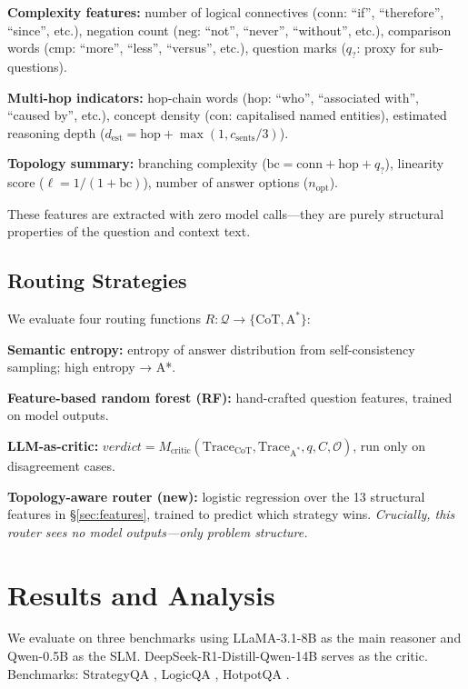 \documentclass[11pt]{article}
\begin{document}
\textbf{Complexity features:} number of logical connectives ($\mathrm{conn}$: ``if'', ``therefore'', ``since'', etc.), negation count ($\mathrm{neg}$: ``not'', ``never'', ``without'', etc.), comparison words ($\mathrm{cmp}$: ``more'', ``less'', ``versus'', etc.), question marks ($q_?$: proxy for sub-questions).

\textbf{Multi-hop indicators:} hop-chain words ($\mathrm{hop}$: ``who'', ``associated with'', ``caused by'', etc.), concept density ($\mathrm{con}$: capitalised named entities), estimated reasoning depth ($d_{\mathrm{est}} = \mathrm{hop} + \max(1, c_{\mathrm{sents}}/3)$).

\textbf{Topology summary:} branching complexity ($\mathrm{bc} = \mathrm{conn} + \mathrm{hop} + q_?$), linearity score ($\ell = 1/(1+\mathrm{bc})$), number of answer options ($n_{\mathrm{opt}}$).

These features are extracted with zero model calls—they are purely structural properties of the question and context text.

\subsection{Routing Strategies}

We evaluate four routing functions $R : \mathcal{Q} \to \{\mathrm{CoT}, \mathrm{A^*}\}$:

\textbf{Semantic entropy:} entropy of answer distribution from self-consistency sampling; high entropy → A*.

\textbf{Feature-based random forest (RF):} hand-crafted question features, trained on model outputs.

\textbf{LLM-as-critic:} $\mathit{verdict} = M_{\mathrm{critic}}(\mathrm{Trace}_{\mathrm{CoT}}, \mathrm{Trace}_{\mathrm{A^*}}, q, C, \mathcal{O})$, run only on disagreement cases.

\textbf{Topology-aware router (new):} logistic regression over the 13 structural features in \S\ref{sec:features}, trained to predict which strategy wins. \emph{Crucially, this router sees no model outputs—only problem structure.}

\section{Results and Analysis}
\label{sec:results}

We evaluate on three benchmarks using LLaMA-3.1-8B as the main reasoner and Qwen-0.5B as the SLM. DeepSeek-R1-Distill-Qwen-14B serves as the critic. Benchmarks: StrategyQA \citep{geva2021did}, LogicQA \citep{liu2020logiqa}, HotpotQA \citep{yang2018hotpotqa}.
\end{document}
